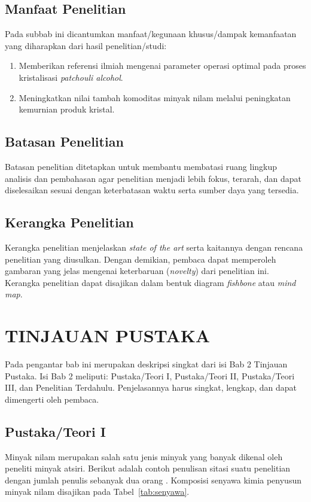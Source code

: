 \documentclass[skripsi,laporan]{itkta2025}
\begin{document}
\section{Manfaat Penelitian}
Pada subbab ini dicantumkan manfaat/kegunaan khusus/dampak kemanfaatan yang diharapkan dari hasil penelitian/studi:
\begin{enumerate}[label=\arabic*.]
  \item Memberikan referensi ilmiah mengenai parameter operasi optimal pada proses kristalisasi \textit{patchouli alcohol}.
  \item Meningkatkan nilai tambah komoditas minyak nilam melalui peningkatan kemurnian produk kristal.
\end{enumerate}

\section{Batasan Penelitian}
Batasan penelitian ditetapkan untuk membantu membatasi ruang lingkup analisis dan pembahasan agar penelitian menjadi lebih fokus, terarah, dan dapat diselesaikan sesuai dengan keterbatasan waktu serta sumber daya yang tersedia.

\section{Kerangka Penelitian}
Kerangka penelitian menjelaskan \textit{state of the art} serta kaitannya dengan rencana penelitian yang diusulkan. Dengan demikian, pembaca dapat memperoleh gambaran yang jelas mengenai keterbaruan (\textit{novelty}) dari penelitian ini. Kerangka penelitian dapat disajikan dalam bentuk diagram \textit{fishbone} atau \textit{mind map}.

\chapter{TINJAUAN PUSTAKA}
Pada pengantar bab ini merupakan deskripsi singkat dari isi Bab 2 Tinjauan Pustaka. Isi Bab 2 meliputi: Pustaka/Teori I, Pustaka/Teori II, Pustaka/Teori III, dan Penelitian Terdahulu. Penjelasannya harus singkat, lengkap, dan dapat dimengerti oleh pembaca.

\section{Pustaka/Teori I}
Minyak nilam merupakan salah satu jenis minyak yang banyak dikenal oleh peneliti minyak atsiri. Berikut adalah contoh penulisan sitasi suatu penelitian dengan jumlah penulis sebanyak dua orang \citep{isfaroiny2005}. Komposisi senyawa kimia penyusun minyak nilam disajikan pada Tabel~\ref{tab:senyawa}.
\end{document}
